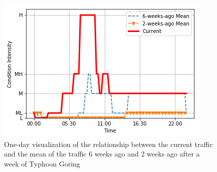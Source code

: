 \begin{figure}
  \includegraphics[width=\linewidth]{figures/figure_traffic_mean_2weeks_vs_6weeks_disrupted.png}
  \caption{One-day visualization of the relationship between the current traffic and the mean of the traffic 6 weeks ago and 2 weeks ago after a week of Typhoon Goring}
  \label{figure_traffic_mean_2weeks_vs_6weeks_disrupted}
\end{figure}



























